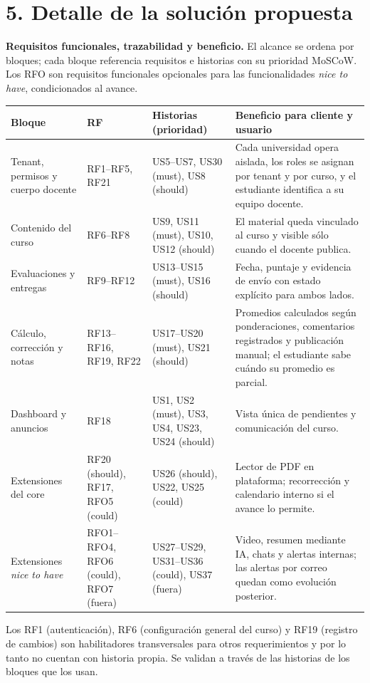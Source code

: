 \documentclass[letterpaper,10pt]{article}
\begin{document}
\section{5. Detalle de la solución propuesta}

\textbf{Requisitos funcionales, trazabilidad y beneficio.} El alcance se ordena por bloques; cada bloque referencia requisitos e historias con su prioridad MoSCoW. Los RFO son requisitos funcionales opcionales para las funcionalidades \emph{nice to have}, condicionados al avance.

{\small
\begin{tabularx}{\textwidth}{|p{2.5cm}|p{2.05cm}|Y|Y|}
\hline
\textbf{Bloque} & \textbf{RF} & \textbf{Historias (prioridad)} & \textbf{Beneficio para cliente y usuario} \\
\hline
Tenant, permisos y cuerpo docente & RF1--RF5, RF21 & US5--US7, US30 (must), US8 (should) & Cada universidad opera aislada, los roles se asignan por tenant y por curso, y el estudiante identifica a su equipo docente. \\
\hline
Contenido del curso & RF6--RF8 & US9, US11 (must), US10, US12 (should) & El material queda vinculado al curso y visible sólo cuando el docente publica. \\
\hline
Evaluaciones y entregas & RF9--RF12 & US13--US15 (must), US16 (should) & Fecha, puntaje y evidencia de envío con estado explícito para ambos lados. \\
\hline
Cálculo, corrección y notas & RF13--RF16, RF19, RF22 & US17--US20 (must), US21 (should) & Promedios calculados según ponderaciones, comentarios registrados y publicación manual; el estudiante sabe cuándo su promedio es parcial. \\
\hline
Dashboard y anuncios & RF18 & US1, US2 (must), US3, US4, US23, US24 (should) & Vista única de pendientes y comunicación del curso. \\
\hline
Extensiones del core & RF20 (should), RF17, RFO5 (could) & US26 (should), US22, US25 (could) & Lector de PDF en plataforma; recorrección y calendario interno si el avance lo permite. \\
\hline
Extensiones \emph{nice to have} & RFO1--RFO4, RFO6 (could), RFO7 (fuera) & US27--US29, US31--US36 (could), US37 (fuera) & Video, resumen mediante IA, chats y alertas internas; las alertas por correo quedan como evolución posterior. \\
\hline
\end{tabularx}}

Los RF1 (autenticación), RF6 (configuración general del curso) y RF19 (registro de cambios) son habilitadores transversales para otros requerimientos y por lo tanto no cuentan con historia propia. Se validan a través de las historias de los bloques que los usan.
\end{document}
